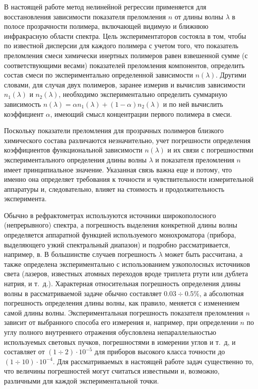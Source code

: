 \documentclass[11pt,a4paper]{article}
\theoremstyle{definition}
\begin{document}
В настоящей работе метод нелинейной регрессии применяется для восстановления
зависимости показателя преломления $n$ от длины волны $\lambda$ в полосе
прозрачности полимера, включающей видимую и ближнюю инфракрасную области спектра.
Цель экспериментаторов состояла в том, чтобы по известной дисперсии для каждого
полимера с учетом того, что показатель преломления смеси химически инертных
полимеров равен взвешенной сумме (с соответствующими весами) показателей
преломления компонентов, определить состав смеси по экспериментально
определенной зависимости $n(\lambda)$. Другими словами, для случая двух
полимеров, заранее измерив и вычислив зависимости $n_1(\lambda)$ и $n_2(\lambda)$,
необходимо экспериментально определить суммарную зависимость
$n(\lambda) = \alpha n_1(\lambda) + (1 - \alpha) n_2(\lambda)$ и по ней
вычислить коэффициент $\alpha$, имеющий смысл концентрации первого полимера в
смеси.

Поскольку показатели преломления для прозрачных полимеров близкого химического
состава различаются незначительно, учет погрешности определения коэффициентов
функциональной зависимости $n(\lambda)$ и их связи с погрешностями
экспериментального определения длины волны $\lambda$ и показателя преломления
$n$ имеет принципиальное значение. Указанная связь важна еще и потому, что
именно она определяет требования к точности и чувствительности измерительной
аппаратуры и, следовательно, влияет на стоимость и продолжительность
эксперимента.

Обычно в рефрактометрах используются источники широкополосного (непрерывного)
спектра, а погрешность выделения конкретной длины волны определяется аппаратной
функцией используемого монохроматора (прибора, выделяющего узкий спектральный
диапазон) и подробно рассматривается, например, в\cite{Malishev79,Zaidel72}.
В большинстве случаев погрешность $\lambda$ может быть рассчитана, а также
определена экспериментально с использованием узкополосных источников света
(лазеров, известных атомных переходов вроде триплета ртути или дублета натрия,
и т.~д.). Характерная относительная погрешность определения длины волны в
рассматриваемой задаче обычно составляет $0.03 \div 0.5\%$, а 
абсолютная погрешность определения длины волны, как правило, меняется с
изменением самой длины волны. Экспериментальная погрешность показателя
преломления $n$ зависит от выбранного способа его измерения и, например,
при определении $n$ по углу полного внутреннего отражения обусловлена
непараллельностью используемых световых пучков, погрешностями в измерении углов
и т.~д, и составляет от $(1 \div 2) \cdot 10^{-5}$ для приборов высокого класса
точности до $(1 \div 10) \cdot 10^{-4}$. Для рассматриваемых в настоящей работе
задач существенно то, что величины погрешностей могут считаться известными и,
возможно, различными для каждой экспериментальной точки.
\end{document}
